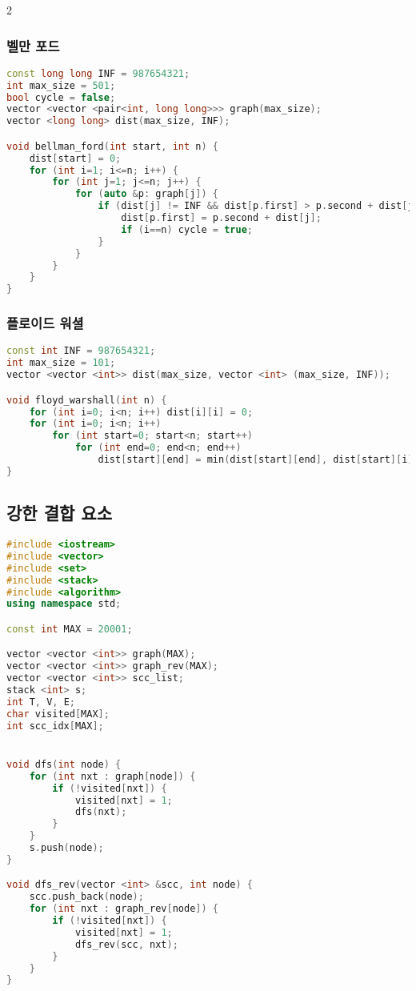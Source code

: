 \documentclass[]{article}
\begin{document}
\begin{multicols*}{2}
\subsubsection{벨만 포드}
\begin{lstlisting}[language=c++]
const long long INF = 987654321;
int max_size = 501;
bool cycle = false;
vector <vector <pair<int, long long>>> graph(max_size);
vector <long long> dist(max_size, INF);

void bellman_ford(int start, int n) {
    dist[start] = 0;
    for (int i=1; i<=n; i++) {
        for (int j=1; j<=n; j++) {
            for (auto &p: graph[j]) {
                if (dist[j] != INF && dist[p.first] > p.second + dist[j]) {
                    dist[p.first] = p.second + dist[j];
                    if (i==n) cycle = true;
                }
            }
        }
    }
}
\end{lstlisting}
\columnbreak
\subsubsection{플로이드 워셜}
\begin{lstlisting}[language=c++]
const int INF = 987654321;
int max_size = 101;
vector <vector <int>> dist(max_size, vector <int> (max_size, INF));

void floyd_warshall(int n) {
    for (int i=0; i<n; i++) dist[i][i] = 0;
    for (int i=0; i<n; i++)
        for (int start=0; start<n; start++)
            for (int end=0; end<n; end++)
                dist[start][end] = min(dist[start][end], dist[start][i] + dist[i][end]);
}
\end{lstlisting}
\subsection{강한 결합 요소}
\begin{lstlisting}[language=c++]
#include <iostream>
#include <vector>
#include <set>
#include <stack>
#include <algorithm>
using namespace std;

const int MAX = 20001;

vector <vector <int>> graph(MAX);
vector <vector <int>> graph_rev(MAX);
vector <vector <int>> scc_list;
stack <int> s;
int T, V, E;
char visited[MAX];
int scc_idx[MAX];


void dfs(int node) {
    for (int nxt : graph[node]) {
        if (!visited[nxt]) {
            visited[nxt] = 1;
            dfs(nxt);
        }
    }
    s.push(node);
}

void dfs_rev(vector <int> &scc, int node) {
    scc.push_back(node);
    for (int nxt : graph_rev[node]) {
        if (!visited[nxt]) {
            visited[nxt] = 1;
            dfs_rev(scc, nxt);
        }
    }
}


\end{lstlisting}
\end{multicols*}
\end{document}
